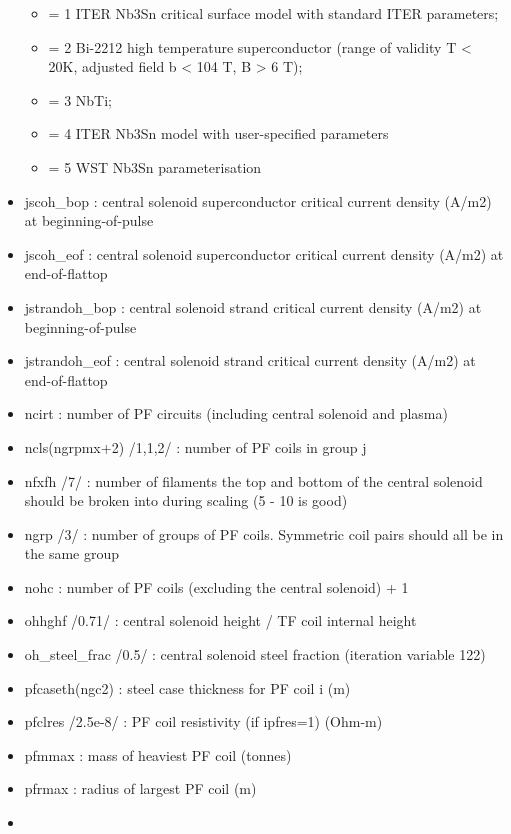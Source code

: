 \documentclass[]{article}
\begin{document}
\begin{itemize}
  \begin{itemize}
  \itemsep1pt\parskip0pt
  \item
    = 1 ITER Nb3Sn critical surface model with standard ITER parameters;
  \item
    = 2 Bi-2212 high temperature superconductor (range of validity T
    \textless{} 20K, adjusted field b \textless{} 104 T, B
    \textgreater{} 6 T);
  \item
    = 3 NbTi;
  \item
    = 4 ITER Nb3Sn model with user-specified parameters
  \item
    = 5 WST Nb3Sn parameterisation
  \end{itemize}
\item
  jscoh\_bop : central solenoid superconductor critical current density
  (A/m2) at beginning-of-pulse
\item
  jscoh\_eof : central solenoid superconductor critical current density
  (A/m2) at end-of-flattop
\item
  jstrandoh\_bop : central solenoid strand critical current density
  (A/m2) at beginning-of-pulse
\item
  jstrandoh\_eof : central solenoid strand critical current density
  (A/m2) at end-of-flattop
\item
  ncirt : number of PF circuits (including central solenoid and plasma)
\item
  ncls(ngrpmx+2) /1,1,2/ : number of PF coils in group j
\item
  nfxfh /7/ : number of filaments the top and bottom of the central
  solenoid should be broken into during scaling (5 - 10 is good)
\item
  ngrp /3/ : number of groups of PF coils. Symmetric coil pairs should
  all be in the same group
\item
  nohc : number of PF coils (excluding the central solenoid) + 1
\item
  ohhghf /0.71/ : central solenoid height / TF coil internal height
\item
  oh\_steel\_frac /0.5/ : central solenoid steel fraction (iteration
  variable 122)
\item
  pfcaseth(ngc2) : steel case thickness for PF coil i (m)
\item
  pfclres /2.5e-8/ : PF coil resistivity (if ipfres=1) (Ohm-m)
\item
  pfmmax : mass of heaviest PF coil (tonnes)
\item
  pfrmax : radius of largest PF coil (m)
\item

\end{itemize}
\end{document}

